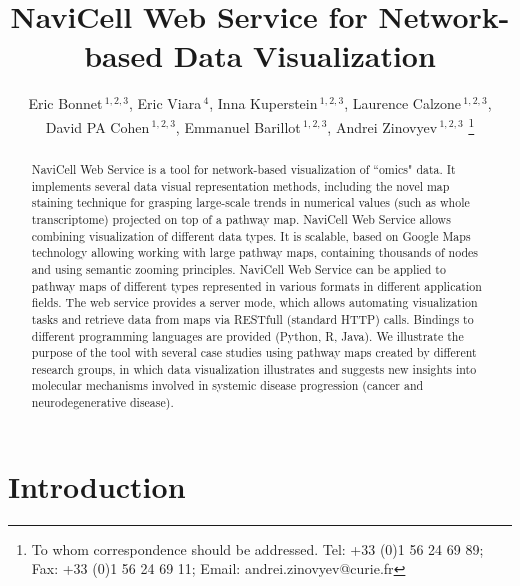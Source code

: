 \documentclass[a4,center,fleqn]{NAR}
\begin{document}
\title{NaviCell Web Service for Network-based Data Visualization}


\author{%
Eric Bonnet\,$^{1,2,3}$,
Eric Viara\,$^{4}$,
Inna Kuperstein\,$^{1,2,3}$,
Laurence Calzone\,$^{1,2,3}$,
David PA Cohen\,$^{1,2,3}$,
Emmanuel Barillot\,$^{1,2,3}$,
Andrei Zinovyev\,$^{1,2,3}$%
\footnote{To whom correspondence should be addressed.
Tel: +33 (0)1 56 24 69 89; Fax: +33 (0)1 56 24 69 11; Email: andrei.zinovyev@curie.fr}}

\address{%
$^{1}$Institut Curie, 26 rue d'Ulm, 75248 Paris, France,
$^{2}$INSERM U900, 75248 Paris, France,
$^{3}$Mines ParisTech, 77300 Fontainebleau, France,
$^{4}$Sysra, 91330 Yerres, France.
}




\maketitle

\begin{abstract}
NaviCell Web Service is a tool for network-based visualization of
``omics" data.  It implements several data visual representation methods,
including the novel map staining technique for grasping large-scale
trends in numerical values (such as whole transcriptome) projected on top of a
pathway map. NaviCell Web Service allows combining visualization of different data types.
It is scalable, based on Google Maps technology allowing working with large pathway maps,
containing thousands of nodes and using semantic zooming principles.
NaviCell Web Service can be applied to pathway maps of different
types represented in various formats in different application fields.
The web service provides a server mode, which allows automating
visualization tasks and retrieve data from maps via RESTfull (standard HTTP)
calls.  Bindings to different programming languages are provided (Python,
R, Java). We illustrate the purpose of the tool  with  several case studies using pathway maps created by different research groups,
in which data visualization illustrates and suggests new insights into molecular mechanisms
involved in systemic disease progression (cancer and neurodegenerative disease).
\end{abstract}


\section{Introduction}
\end{document}
